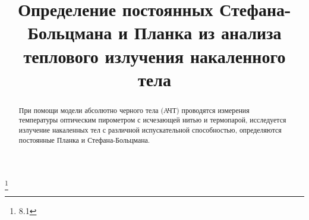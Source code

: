 


\title{Определение постоянных Стефана-Больцмана и Планка из анализа теплового излучения накаленного тела}
\thanks{8.1}



\begin{abstract}
При помощи модели абсолютно черного тела (АЧТ) проводятся измерения температуры оптическим пирометром с исчезающей нитью и термопарой, исследуется излучение накаленных тел с различной испускательной способностью, определяются постоянные Планка и Стефана-Больцмана.

\end{abstract}


\maketitle

